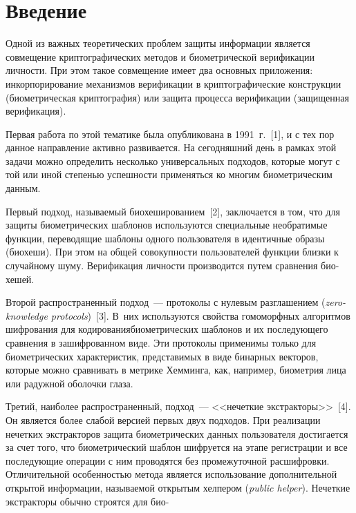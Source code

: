       \thispagestyle{headings}

      \begin{multicols}{2}
      
            \label{st\stat}

\section{Введение}

      Одной из важных теоретических проблем защи\-ты информации является 
совмещение криптографических методов и биометрической верификации личности. При 
этом такое совмещение \mbox{имеет} два основных приложения: инкорпорирование механизмов 
верификации\- в криптографические конструк\-ции (биометрическая криптография) или 
защита процесса верификации (защищенная верификация). 

Первая работа по этой 
тематике была опубликована в 1991~г.~[1], и с тех пор данное направление активно 
развивается. На сегодняшний день в рамках этой задачи можно определить несколько 
универсальных подходов, которые могут с той или иной степенью успешности 
применяться ко многим биометрическим данным. 

Первый подход, называемый 
биохешированием~[2], заключается в том, что для защиты биометрических шаб\-ло\-нов 
используются специальные необратимые функции, переводящие шаблоны одного 
пользователя в идентичные образы (биохеши). При этом на общей совокупности 
пользователей функции близки к случайному шуму. Верификация личности производится 
путем сравнения био-\linebreak хешей. 

Второй распространенный подход~--- протоколы с нулевым 
разглашением (\textit{zero-knowledge protocols})~[3]. В~них используются свойства 
гомоморфных алгоритмов шифрования для кодирования\linebreak биометрических шаб\-ло\-нов и их 
последующего сравнения в зашифрованном виде. Эти протоколы применимы только для 
биометрических характеристик, представимых в виде бинарных векторов, которые можно 
сравнивать в метрике Хемминга, как, например, био\-мет\-рия лица или радужной оболочки 
глаза. 

Третий, наиболее распространенный, подход~--- <<нечеткие экстракторы>>~[4]. Он 
является более слабой версией первых двух подходов. При реализации нечетких 
экстракторов защита био\-мет\-ри\-че\-ских данных пользователя достигается за счет того, что 
био\-мет\-ри\-че\-ский шаб\-лон шифруется на этапе регистрации и все последующие операции с 
ним проводятся без промежуточной расшифровки. Отличительной особенностью метода 
является использование дополнительной открытой информации, на\-зы\-ва\-емой открытым 
хелпером (\textit{public helper}). Нечеткие экстракторы обычно строятся для 
био-\linebreak\vspace*{-12pt}
\begin{center} %
\vspace*{1pt}
\mbox{%
 \epsfxsize=77.483mm
}


\end{center}
\end{multicols}
